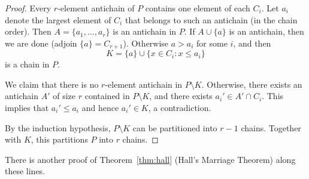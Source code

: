 \documentclass[11pt, a4paper]{ctexrep}
\begin{document}
\begin{proof}
    Every $r$-element antichain of $P$ contains one element of each $C_i$.
    Let $a_i$ denote the largest element of $C_i$ that belongs to such an antichain (in the chain order).
    Then $A=\{a_1,\dots,a_r\}$ is an antichain in $P$.
    If $A\cup\{a\}$ is an antichain, then we are done (adjoin $\{a\}=C_{r+1}$).
    Otherwise $a>a_i$ for some $i$, and then
    \[
        K=\{a\}\cup\{x\in C_i:x\leqslant a_i\}
    \]
    is a chain in $P$.
    \begin{center}
    \end{center}

    We claim that there is no $r$-element antichain in $P\setminus K$.
    Otherwise, there exists an antichain $A'$ of size $r$ contained in $P\setminus K$, and there exists $a_i'\in A'\cap C_i$.
    This implies that $a_i'\leqslant a_i$ and hence $a_i'\in K$, a contradiction.

    By the induction hypothesis, $P\setminus K$ can be partitioned into $r-1$ chains.
    Together with $K$, this partitions $P$ into $r$ chains.
\end{proof}

\begin{remark}
    There is another proof of Theorem~\ref{thm:hall} (Hall's Marriage Theorem) along these lines.
\end{remark}
\end{document}
